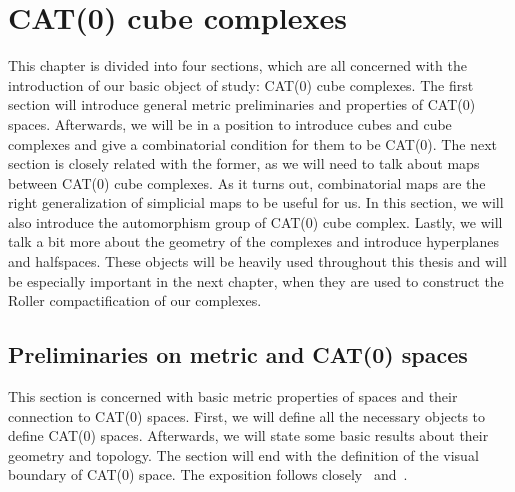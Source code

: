 \section{CAT(0) cube complexes}
\label{sec:complexes}
This chapter is divided into four sections, which are all concerned with the introduction of our basic object of study: CAT(0) cube complexes. The first section will introduce general metric preliminaries and properties of CAT(0) spaces. Afterwards, we will be in a position to introduce cubes and cube complexes and give a combinatorial condition for them to be CAT(0). The next section is closely related with the former, as we will need to talk about maps between CAT(0) cube complexes. As it turns out, combinatorial maps are the right generalization of simplicial maps to be useful for us. In this section, we will also introduce the automorphism group of CAT(0) cube complex. Lastly, we will talk a bit more about the geometry of the complexes and introduce hyperplanes and halfspaces. These objects will be heavily used throughout this thesis and will be especially important in the next chapter, when they are used to construct the Roller compactification of our complexes.

\subsection{Preliminaries on metric and CAT(0) spaces}
\label{sec:metric}
This section is concerned with basic metric properties of spaces and their connection to CAT(\(0\)) spaces. First, we will define all the necessary objects to define CAT(0) spaces. Afterwards, we will state some basic results about their geometry and topology. The section will end with the definition of the visual boundary of CAT(0) space. The exposition follows closely~\cite{MR1744486} and~\cite{Rolli2012}.

